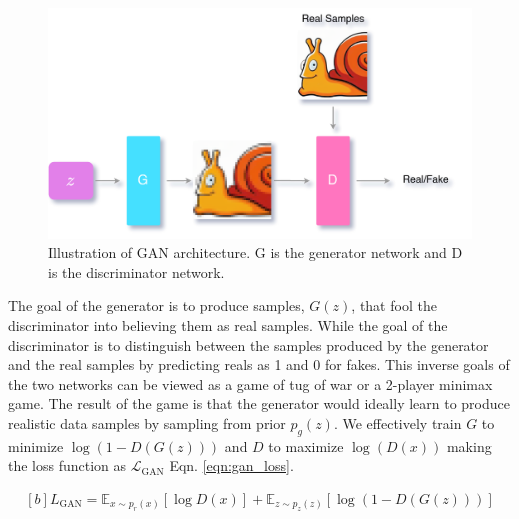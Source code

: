 \begin{figure}[h]
    \centering
    \includegraphics[scale=0.2]{figures/arch/gan_arch.png}
    \caption{Illustration of GAN architecture. G is the generator network and D is the discriminator network.}
    \label{fig:gan_arch}
\end{figure}

The goal of the generator is to produce samples, $G(z)$, that fool the discriminator into believing them as real samples. While the goal of the discriminator is to distinguish between the samples produced by the generator and the real samples by predicting reals as 1 and 0 for fakes. This inverse goals of the two networks can be viewed as a game of tug of war or a 2-player minimax game. The result of the game is that the generator would ideally learn to produce realistic data samples by sampling from prior $p_{g}(z)$. We effectively train $G$ to minimize $\log(1-D(G({z})))$ and $D$ to maximize $\log(D(x))$ making the loss function as $\mathcal{L}_{\mathrm{GAN}}$ Eqn. \ref{eqn:gan_loss}.

\begin{equation} \label{eqn:gan_loss}
    \begin{gathered}[b]
        {L}_{\mathrm{GAN}}=\mathbb{E}_{{x} \sim p_{r}(x)}[\log D({x})]+\mathbb{E}_{{z} \sim p_{z}(z)}[\log (1-D(G({z})))]
    \end{gathered}
\end{equation}

